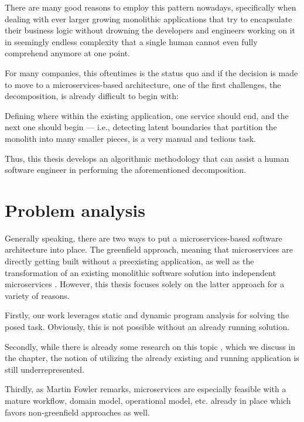 \documentclass[12pt,a4paper]{report}
\begin{document}
There are many good reasons to employ this pattern nowadays, specifically when
dealing with ever larger growing monolithic applications that try to
encapsulate their business logic without drowning the developers and engineers
working on it in seemingly endless complexity that a single human cannot even
fully comprehend anymore at one point.

For many companies, this oftentimes is the status quo and if the decision is
made to move to a microservices\hyp based architecture, one of the first
challenges, the decomposition, is already difficult to begin with:

Defining where within the existing application, one service should end, and the
next one should begin --- i.e., detecting latent boundaries that partition the
monolith into many smaller pieces, is a very manual and tedious task.

Thus, this thesis develops an algorithmic methodology that can assist a human
software engineer in performing the aforementioned decomposition.



\section{Problem analysis}

Generally speaking, there are two ways to put a microservices\hyp based
software architecture into place. The greenfield approach, meaning that
microservices are directly getting built without a preexisting application, as
well as the transformation of an existing monolithic software solution into
independent microservices \cite{fowler-break-monolith}. However, this thesis
focuses solely on the latter approach for a variety of reasons.

Firstly, our work leverages static and dynamic program analysis for solving the
posed task. Obviously, this is not possible without an already running
solution.

Secondly, while there is already some research on this topic
\cite{fritzsch2018monolith}, which we discuss in the \textit{}
chapter, the notion of utilizing the already existing and running application
is still underrepresented.

Thirdly, as Martin Fowler remarks, microservices are especially feasible with a
mature workflow, domain model, operational model, etc. already in place
\cite{fowler-monolith-first, fowler-microservices-tradeoffs} which favors
non\hyp greenfield approaches as well.
\end{document}
